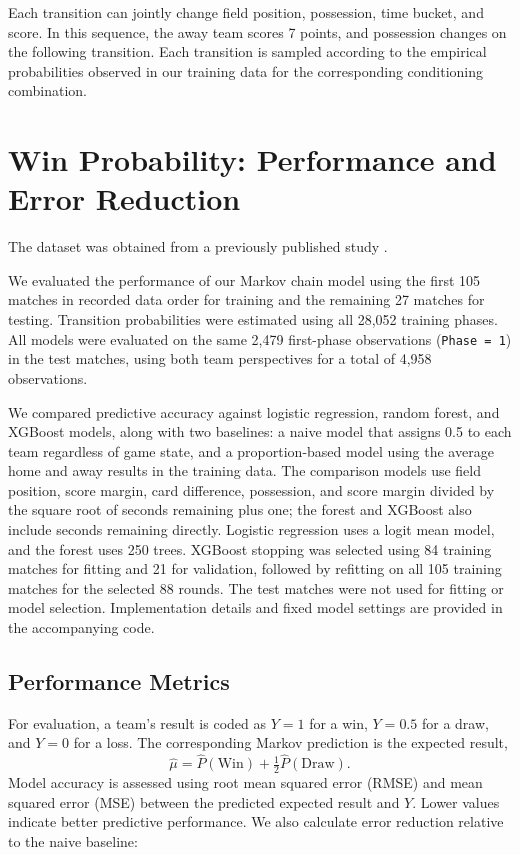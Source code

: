 \documentclass[12pt]{article}
\begin{document}
Each transition can jointly change field position, possession, time bucket, and score. In this sequence, the away team scores 7 points, and possession changes on the following transition. Each transition is sampled according to the empirical probabilities observed in our training data for the corresponding conditioning combination.

\section{Win Probability: Performance and Error Reduction}

The dataset was obtained from a previously published study \citep{Martinez-Arastey2025}.

We evaluated the performance of our Markov chain model using the first 105 matches in recorded data order for training and the remaining 27 matches for testing. Transition probabilities were estimated using all 28,052 training phases. All models were evaluated on the same 2,479 first-phase observations (\texttt{Phase = 1}) in the test matches, using both team perspectives for a total of 4,958 observations.

We compared predictive accuracy against logistic regression, random forest, and XGBoost models, along with two baselines: a naive model that assigns 0.5 to each team regardless of game state, and a proportion-based model using the average home and away results in the training data. The comparison models use field position, score margin, card difference, possession, and score margin divided by the square root of seconds remaining plus one; the forest and XGBoost also include seconds remaining directly. Logistic regression uses a logit mean model, and the forest uses 250 trees. XGBoost stopping was selected using 84 training matches for fitting and 21 for validation, followed by refitting on all 105 training matches for the selected 88 rounds. The test matches were not used for fitting or model selection. Implementation details and fixed model settings are provided in the accompanying code.

\subsection{Performance Metrics}

For evaluation, a team's result is coded as $Y=1$ for a win, $Y=0.5$ for a draw, and $Y=0$ for a loss. The corresponding Markov prediction is the expected result,
\[
\widehat{\mu}=\widehat{P}(\text{Win})+\tfrac12\widehat{P}(\text{Draw}).
\]
Model accuracy is assessed using root mean squared error (RMSE) and mean squared error (MSE) between the predicted expected result and $Y$. Lower values indicate better predictive performance. We also calculate error reduction relative to the naive baseline:
\end{document}
